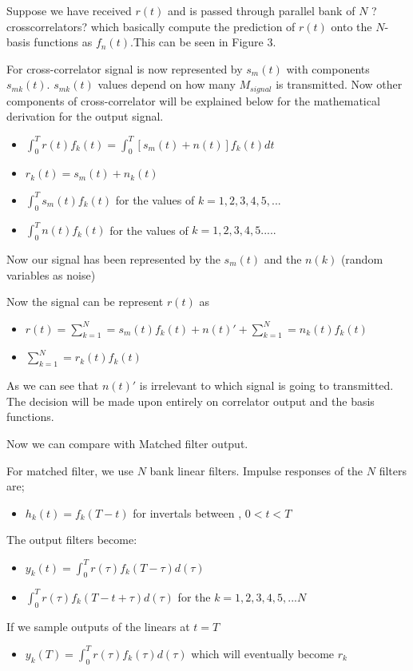 Suppose we have received $r(t)$ and is passed through parallel bank of $N$ ?crosscorrelators? which basically compute the prediction of $r(t)$ onto the $N$-basis functions as $f_n(t)$.This  can be seen in Figure 3.

For cross-correlator  signal is now represented by $s_m(t)$ with components $s_{mk}(t)$. $s_{mk}(t)$ values depend on how many $M_{signal}$ is transmitted. Now other components of cross-correlator will be explained below for the mathematical derivation for  the output signal.

\begin{itemize}
	\item $\int_{0}^{T} r(t) f_k(t)=\int_{0}^{T} [s_m(t)+n(t)] f_k(t) dt$
	\item $r_k(t)=s_m(t)+n_k(t)$
	\item $\int_{0}^{T} s_m(t) f_k(t) $ for the values of $k= 1,2,3,4,5,...$
	\item $\int_{0}^{T} n(t) f_k(t) $ for the values of $k=1,2,3,4,5.....$
\end{itemize}

Now our signal has been represented by the $s_m(t)$ and the $n(k)$ (random variables as noise)

Now the signal can be represent $r(t)$ as

\begin{itemize}
	\item $r(t)= \sum\limits_{k=1}^N = s_m(t) f_k(t)+ n(t)'+\sum\limits_{k=1}^N = n_k(t) f_k(t)$
	\item $\sum\limits_{k=1}^N = r_k(t) f_k(t)$
\end{itemize}

As we can see that $n(t)'$ is irrelevant to which signal is going to transmitted. The decision will be made upon entirely on correlator output and the basis functions. 

Now we can compare with Matched filter output. 

For matched filter, we use $N$ bank linear filters. Impulse responses of the $N$ filters are;
\begin{itemize}
	\item $h_k(t)=f_k(T-t)$ for invertals between , $0<t<T$
\end{itemize}

The output filters become:
\begin{itemize}
	\item $y_k(t)=\int_{0}^{T} r(\tau) f_k(T-\tau)d(\tau)$
	\item $\int_{0}^{T} r(\tau) f_k(T-t+\tau)d(\tau)$ for the $k= 1,2,3,4,5,...N$
\end{itemize}
If we sample outputs of the linears at $t=T$
\begin{itemize}
\item $y_k(T)=\int_{0}^{T} r(\tau) f_k(\tau)d(\tau)$ which will eventually become $r_k$
\end{itemize}

